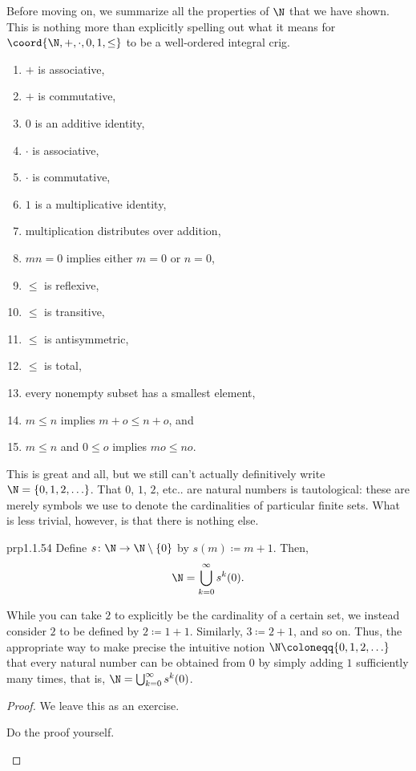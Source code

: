 Before moving on, we summarize all the properties of $\N$ that we have shown.  This is nothing more than explicitly spelling out what it means for $\coord{\N ,+,\cdot ,0,1,\leq}$ to be a well-ordered integral crig.
\begin{enumerate}
\item $+$ is associative,
\item $+$ is commutative,
\item $0$ is an additive identity,
\item $\cdot$ is associative,
\item $\cdot$ is commutative,
\item $1$ is a multiplicative identity,
\item multiplication distributes over addition,
\item $mn=0$ implies either $m=0$ or $n=0$,
\item $\leq$ is reflexive,
\item $\leq$ is transitive,
\item $\leq$ is antisymmetric,
\item $\leq$ is total,
\item every nonempty subset has a smallest element,
\item $m\leq n$ implies $m+o\leq n+o$, and
\item $m\leq n$ and $0\leq o$ implies $mo\leq no$.
\end{enumerate}

This is great and all, but we still can't actually definitively write $\N =\{ 0,1,2,\ldots \}$.  That $0$, $1$, $2$, etc.. are natural numbers is tautological:  these are merely symbols we use to denote the cardinalities of particular finite sets.  What is  less trivial, however, is that there is nothing else.
\begin{prp}{}{prp1.1.54}
Define $s\colon \N \rightarrow \N \setminus \{ 0\}$ by $s(m)\coloneqq m+1$.  Then,
\begin{equation}
\N =\bigcup _{k=0}^{\infty}s^k(0).
\end{equation}
\begin{rmk}
While you can take $2$ to explicitly be the cardinality of a certain set, we instead consider $2$ to be defined by $2\coloneqq 1+1$.  Similarly, $3\coloneqq 2+1$, and so on.  Thus, the appropriate way to make precise the intuitive notion $\N \coloneqq \{ 0,1,2,\ldots \}$ that every natural number can be obtained from $0$ by simply adding $1$ sufficiently many times, that is, $\N =\bigcup _{k=0}^{\infty}s^k(0)$.
\end{rmk}
\begin{proof}
We leave this as an exercise.
\begin{exr}[breakable=false]{}{}
Do the proof yourself.
\end{exr}
\end{proof}
\end{prp}

